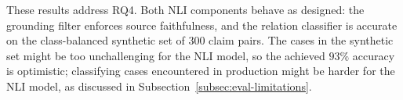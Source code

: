 These results address RQ4. Both NLI components behave as designed: the grounding filter enforces source faithfulness, and the relation classifier is accurate on the class-balanced synthetic set of 300 claim pairs. The cases in the synthetic set might be too unchallenging for the NLI model, so the achieved $93\%$ accuracy is optimistic; classifying cases encountered in production might be harder for the NLI model, as discussed in Subsection~\ref{subsec:eval-limitations}.